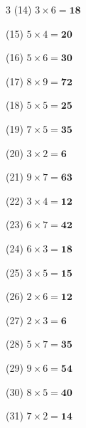 \documentclass[a4paper, 11pt]{ltjsarticle}
\begin{document}
\begin{multicols*}{3}
\noindent (14) \quad $3 \times 6 = \mathbf{18}$
\vspace*{\fill}

\noindent (15) \quad $5 \times 4 = \mathbf{20}$
\vspace*{\fill}

\noindent (16) \quad $5 \times 6 = \mathbf{30}$
\vspace*{\fill}

\noindent (17) \quad $8 \times 9 = \mathbf{72}$
\vspace*{\fill}

\noindent (18) \quad $5 \times 5 = \mathbf{25}$
\vspace*{\fill}

\noindent (19) \quad $7 \times 5 = \mathbf{35}$
\vspace*{\fill}

\noindent (20) \quad $3 \times 2 = \mathbf{6}$
\vspace*{\fill}

\noindent (21) \quad $9 \times 7 = \mathbf{63}$
\vspace*{\fill}

\noindent (22) \quad $3 \times 4 = \mathbf{12}$
\vspace*{\fill}

\noindent (23) \quad $6 \times 7 = \mathbf{42}$
\vspace*{\fill}

\noindent (24) \quad $6 \times 3 = \mathbf{18}$
\vspace*{\fill}
\columnbreak

\noindent (25) \quad $3 \times 5 = \mathbf{15}$
\vspace*{\fill}

\noindent (26) \quad $2 \times 6 = \mathbf{12}$
\vspace*{\fill}

\noindent (27) \quad $2 \times 3 = \mathbf{6}$
\vspace*{\fill}

\noindent (28) \quad $5 \times 7 = \mathbf{35}$
\vspace*{\fill}

\noindent (29) \quad $9 \times 6 = \mathbf{54}$
\vspace*{\fill}

\noindent (30) \quad $8 \times 5 = \mathbf{40}$
\vspace*{\fill}

\noindent (31) \quad $7 \times 2 = \mathbf{14}$
\vspace*{\fill}


\end{multicols*}
\end{document}
